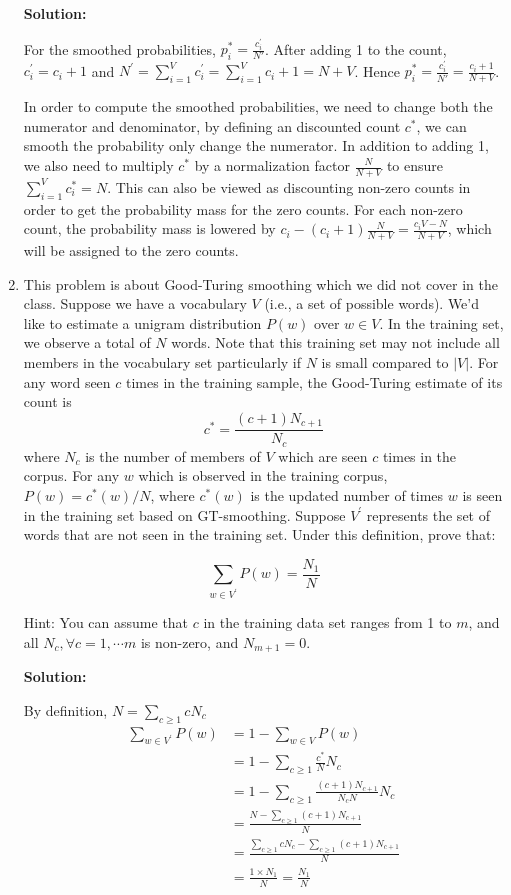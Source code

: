\documentclass[11pt]{article}
\begin{document}
\begin{enumerate}
\textbf{Solution:}

For the smoothed probabilities, $p^*_i = \frac{c_i^{'}}{N'}$. After adding 1 to the count, $c_i^{'} = c_i + 1$ and $N^{'} = \sum_{i=1}^V c_i^{'}=\sum_{i=1}^V c_i + 1 = N + V$. Hence $p^*_i = \frac{c_i^{'}}{N'} = \frac{c_i+1}{N+V}$. 

In order to compute the smoothed probabilities, we need to change both the numerator and denominator, by defining an discounted count $c^*$, we can smooth the probability only change the numerator. In addition to adding 1, we also need to multiply $c^*$ by a normalization factor $\frac{N}{N+V}$ to ensure $\sum_{i=1}^V c^*_i = N$. This can also be viewed as discounting non-zero counts in order to get the probability mass for the zero counts. For each non-zero count, the probability mass is lowered by $c_i - (c_i+1)\frac{N}{N+V} = \frac{c_i V - N}{N+V}$, which will be assigned to the zero counts.

\vspace{10pt}

\item This problem is about Good-Turing smoothing which we did not cover in the class. 
Suppose we have a vocabulary $V$ (i.e., a set of possible words). We'd like to estimate a unigram distribution $P(w)$ over $w \in V$. In the training set, we observe a total of $N$ words. Note that this training set may not include all members in the vocabulary set particularly if $N$ is small compared to $|V|$.  For any word seen $c$ times in the training sample, the Good-Turing estimate of its count is \[c^{*} = \frac{(c+1)N_{c+1}} {N_{c}} \]
where $N_{c}$ is the number of members of $V$ which are seen $c$ times in the corpus. For any $w$ which is observed in the training corpus, $P(w) = c^{*}(w)/N$, where $c^{*}(w)$ is the updated number of times $w$ is seen in the training set based on GT-smoothing. Suppose $V^{'}$ represents the set of words that are not seen in the training set. Under this definition, prove that: 

\[ \sum_{w \in V^{'} }P(w)=  \frac{N_{1}}{ N} \]

Hint: You can assume that $c$ in the training data set ranges from 1 to $m$, and
all $N_c,\forall c=1,\cdots m$ is non-zero, and $N_{m+1}=0$.

\textbf{Solution:}

By definition, $N = \sum_{c\ge 1} c N_c$
\begin{align*}
\sum_{w \in V^{'} }P(w) 
&= 1 - \sum_{w \in V}P(w) \\
&= 1 - \sum_{c\ge1} \frac{c^*}{N} N_c \\
&= 1 - \sum_{c\ge1} \frac{(c+1)N_{c+1}} {N_{c}N} N_c \\
&= \frac{N - \sum_{c\ge 1} (c+1)N_{c+1}}{N} \\
&= \frac{\sum_{c\ge 1} c N_c- \sum_{c\ge 1} (c+1)N_{c+1}}{N}  \\
&= \frac{1 \times N_1}{N} = \frac{N_1}{N}
\end{align*}


\end{enumerate}
\end{document}
